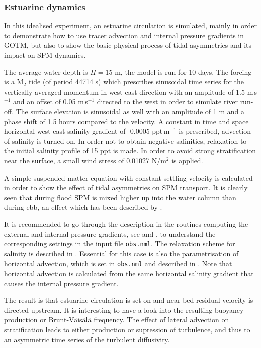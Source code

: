 \subsubsection{Estuarine dynamics}\label{estuary}


In this idealised experiment, an estuarine circulation is simulated,
mainly in order to demonstrate how to use tracer advection and
internal pressure gradients in GOTM, but also to show the basic
physical process of tidal asymmetries and its impact on SPM dynamics.

The average water depth is $H=15$ m, the model is run for 10 days.
The forcing is a M$_2$ tide (of period 44714 s) which prescribes
sinusoidal time series for the vertically averaged momentum in
west-east direction with an amplitude of 1.5 m\,s$^{-1}$ and an offset
of 0.05 m\,s$^{-1}$ directed to the west in order to simulate river
run-off.  The surface elevation is sinusoidal as well with an
amplitude of 1 m and a phase shift of 1.5 hours compared to the
velocity.  A constant in time and space horizontal west-east salinity
gradient of -0.0005 ppt\,m$^{-1}$ is prescribed, advection of salinity
is turned on. In order not to obtain negative salinities, relaxation
to the initial salinity profile of 15 ppt is made.  In order to avoid
strong stratification near the surface, a small wind stress of 0.01027
N/m$^2$ is applied.

A simple suspended matter equation with constant settling velocity is
calculated in order to show the effect of tidal asymmetries on SPM
transport. It is clearly seen that during flood SPM is mixed higher up into 
the water column than during ebb, an effect which has been described 
by \cite{Geyer93}.

It is recommended to go through the description in the routines
computing the external and internal pressure gradients, see
 and , to understand the
corresponding settings in the input file {\tt obs.nml}. The relaxation
scheme for salinity is described in .  Essential
for this case is also the parametrisation of horizontal advection,
which is set in {\tt obs.nml} and described in
. Note that horizontal advection is calculated from
the same horizontal salinity gradient that causes the internal
pressure gradient.

The result is that estuarine circulation is set on and near bed
residual velocity is directed upstream. It is interesting to have a
look into the resulting buoyancy production or Brunt-V\"ais\"al\"a
frequency.  The effect of lateral advection on stratification leads to
either production or supression of turbulence, and thus to an
asymmetric time series of the turbulent diffusivity.

